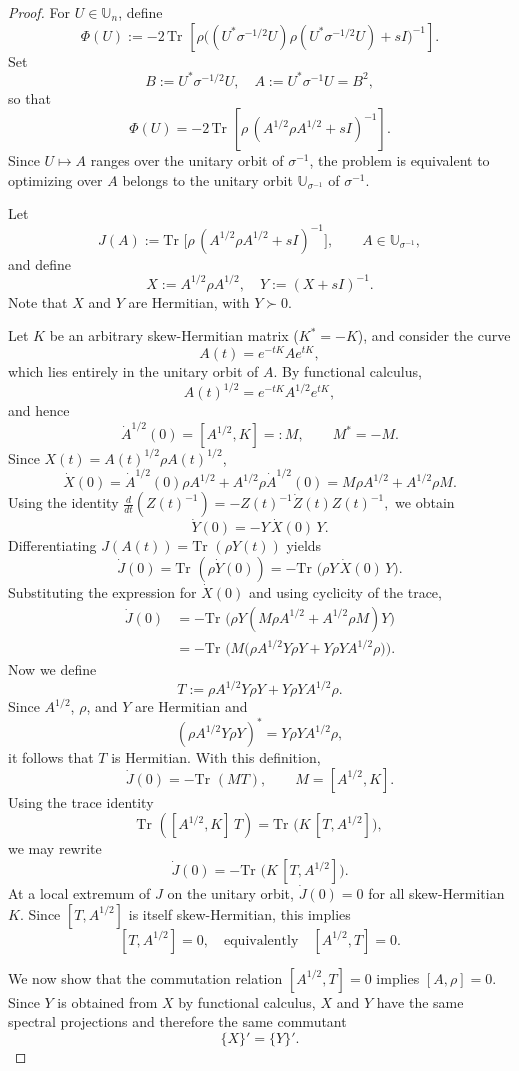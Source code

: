 \documentclass[10pt,a4paper]{amsart}
\def\Tr{\text{Tr }}
\begin{document}
\begin{proof} 
For $U\in\mathbb U_n$, define
$$
\Phi(U)
:=
-2\,\Tr\!\left[
\rho\Big((U^*\sigma^{-1/2}U)\rho(U^*\sigma^{-1/2}U)+sI\Big)^{-1}
\right].
$$
Set
$$ B:=U^*\sigma^{-1/2}U,\quad A:=U^*\sigma^{-1}U=B^2,$$
so that
\[
\Phi(U)=-2\,\Tr\!\left[\rho\,(A^{1/2}\rho A^{1/2}+sI)^{-1}\right].
\]
Since $U\mapsto A$ ranges over the unitary orbit of $\sigma^{-1}$, the problem is equivalent to optimizing over $A$ belongs to the unitary orbit $\mathbb U_{\sigma^{-1}}$ of $\sigma^{-1}$.

Let
$$
J(A):=\Tr\!\big[\rho\,(A^{1/2}\rho A^{1/2}+sI)^{-1}\big],
\qquad A\in\mathbb U_{\sigma^{-1}},
$$
and define
$$
X:=A^{1/2}\rho A^{1/2},\quad
Y:=(X+sI)^{-1}.
$$
Note that $X$ and $Y$ are Hermitian, with $Y\succ 0$.

Let $K$ be an arbitrary skew-Hermitian matrix ($K^*=-K$), and consider the curve
$$
A(t)=e^{-tK}Ae^{tK},
$$
which lies entirely in the unitary orbit of $A$.
By functional calculus,
$$
A(t)^{1/2}=e^{-tK}A^{1/2}e^{tK},
$$
and hence
$$
\dot A^{1/2}(0)=[A^{1/2},K]=:M,
\qquad M^*=-M.
$$
Since $X(t)=A(t)^{1/2}\rho A(t)^{1/2}$,
$$
\dot X(0)=\dot A^{1/2}(0)\rho A^{1/2}+A^{1/2}\rho\dot A^{1/2}(0)
= M\rho A^{1/2}+A^{1/2}\rho M.
$$
Using the identity
\(
\frac{d}{dt}(Z(t)^{-1})=-Z(t)^{-1}\dot Z(t)Z(t)^{-1},
\)
we obtain
\[
\dot Y(0)=-Y\,\dot X(0)\,Y.
\]
Differentiating $J(A(t))=\Tr(\rho Y(t))$ yields
$$
\dot J(0)
=\Tr(\rho\dot Y(0))
=-\Tr\big(\rho Y\,\dot X(0)\,Y\big).
$$
Substituting the expression for $\dot X(0)$ and using cyclicity of the trace,
\begin{align*}
\dot J(0)
&=-\Tr\big(\rho Y (M\rho A^{1/2}+A^{1/2}\rho M)Y\big)\\
&=-\Tr\Big(M\big(\rho A^{1/2}Y\rho Y+Y\rho Y A^{1/2}\rho\big)\Big).
\end{align*}
Now we define
$$
T:=\rho A^{1/2}Y\rho Y+Y\rho Y A^{1/2}\rho.
$$
Since $A^{1/2}$, $\rho$, and $Y$ are Hermitian and
\[
(\rho A^{1/2}Y\rho Y)^*=Y\rho Y A^{1/2}\rho,
\]
it follows that $T$ is Hermitian. With this definition,
\[
\dot J(0)=-\Tr(MT),
\qquad M=[A^{1/2},K].
\]
Using the trace identity
\[
\Tr([A^{1/2},K]\,T)=\Tr\big(K\,[T,A^{1/2}]\big),
\]
we may rewrite
\[
\dot J(0)=-\Tr\big(K\,[T,A^{1/2}]\big).
\]
At a local extremum of $J$ on the unitary orbit, $\dot J(0)=0$ for all
skew-Hermitian $K$. Since $[T,A^{1/2}]$ is itself skew-Hermitian, this implies
\[
[T,A^{1/2}]=0,
\quad\text{equivalently}\quad
[A^{1/2},T]=0.
\]

We now show that the commutation relation $[A^{1/2},T]=0$ implies $[A,\rho]=0$.
Since $Y$ is obtained from $X$ by functional calculus, $X$ and $Y$ have the same
spectral projections and therefore the same commutant
\[
\{X\}'=\{Y\}'.
\]


\end{proof}
\end{document}
